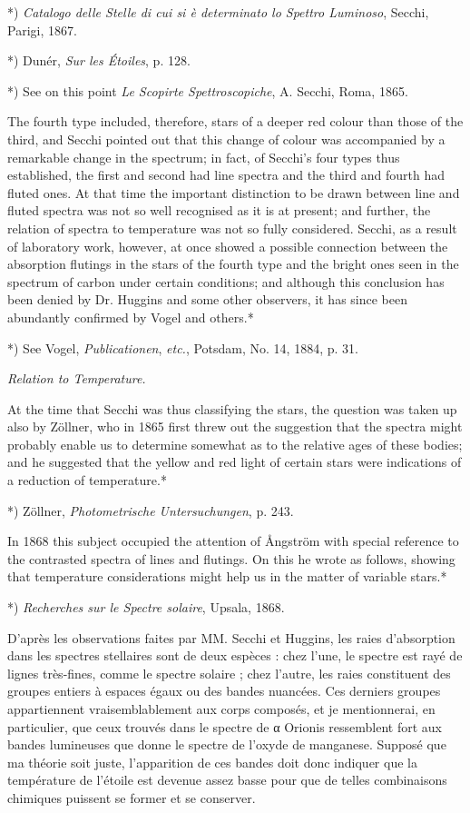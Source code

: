 \documentclass[a4paper, 12pt, oneside, polutonikogreek, english]{article}
\begin{document}
*) \emph{Catalogo delle Stelle di cui si è determinato lo Spettro Luminoso}, Secchi, Parigi, 1867.

*) Dunér, \emph{Sur les Étoiles}, p. 128.

*) See on this point \emph{Le Scopirte Spettroscopiche}, A. Secchi, Roma, 1865.

The fourth type included, therefore, stars of a deeper red colour than those of the third, and Secchi pointed out that this change of colour was accompanied by a remarkable change in the spectrum; in fact, of Secchi's four types thus established, the first and second had line spectra and the third and fourth had fluted ones. At that time the important distinction to be drawn between line and fluted spectra was not so well recognised as it is at present; and further, the relation of spectra to temperature was not so fully considered. Secchi, as a result of laboratory work, however, at once showed a possible connection between the absorption flutings in the stars of the fourth type and the bright ones seen in the spectrum of carbon under certain conditions; and although this conclusion has been denied by Dr. Huggins and some other observers, it has since been abundantly confirmed by Vogel and others.*

*) See Vogel, \emph{Publicationen}, \emph{etc.}, Potsdam, No. 14, 1884, p. 31.

\emph{Relation to Temperature.}

At the time that Secchi was thus classifying the stars, the question was taken up also by Zöllner, who in 1865 first threw out the suggestion that the spectra might probably enable us to determine somewhat as to the relative ages of these bodies; and he suggested that the yellow and red light of certain stars were indications of a reduction of temperature.*

*) Zöllner, \emph{Photometrische Untersuchungen}, p. 243.

In 1868 this subject occupied the attention of Ångström with special reference to the contrasted spectra of lines and flutings. On this he wrote as follows, showing that temperature considerations might help us in the matter of variable stars.*

*) \emph{Recherches sur le Spectre solaire}, Upsala, 1868.

D'après les observations faites par MM. Secchi et Huggins, les raies d'absorption dans les spectres stellaires sont de deux espèces : chez l'une, le spectre est rayé de lignes très-fines, comme le spectre solaire ; chez l'autre, les raies constituent des groupes entiers à espaces égaux ou des bandes nuancées. Ces derniers groupes appartiennent vraisemblablement aux corps composés, et je mentionnerai, en particulier, que ceux trouvés dans le spectre de α Orionis ressemblent fort aux bandes lumineuses que donne le spectre de l'oxyde de manganese. Supposé que ma théorie soit juste, l'apparition de ces bandes doit donc indiquer que la température de l'étoile est devenue assez basse pour que de telles combinaisons chimiques puissent se former et se conserver.
\end{document}
